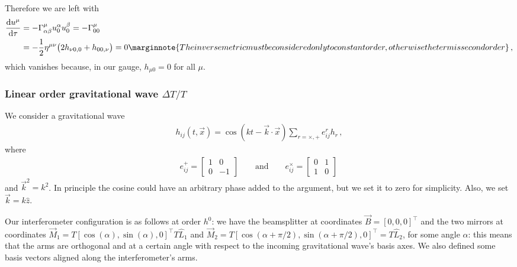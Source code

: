 \documentclass[main.tex]{subfiles}
\begin{document}
Therefore we are left with 
%
\begin{subequations}
\begin{align}
\dv{ u^{\mu }}{\tau } &= - \Gamma^{\mu }_{\alpha \beta } u^{\alpha }_{0} u^{\beta }_{0} = - \Gamma^{\mu }_{00} \\
&= - \frac{1}{2} \eta^{\mu \nu } \qty(2h_{\nu  0, 0} + h_{00,\nu }) = 0 \marginnote{The inverse metric must be considered only to constant order, otherwise the term is second order}
\,,
\end{align}
\end{subequations}
%
which vanishes because, in our gauge, \(h_{\mu 0} = 0\) for all \(\mu \). 

\subsubsection{Linear order gravitational wave \(\Delta T / T\)}

We consider a gravitational wave 
%
\begin{align}
h_{ij} (t, \vec{x}) = \cos(kt - \vec{k} \cdot \vec{x}) \sum _{r = \times , +} e_{ij}^{r} h_{r}
\,,
\end{align}
%
where 
%
\begin{subequations}
\begin{align}
e_{ij}^{+} = \left[\begin{array}{cc}
1 &  0 \\ 
0 & -1
\end{array}\right] \qquad \text{and} \qquad
e_{ij}^{ \times } = \left[\begin{array}{cc}
0 & 1 \\ 
1 & 0
\end{array}\right]
\,
\end{align}
\end{subequations}
%
and \(\vec{k}^2 = k^2\). In principle the cosine could have an arbitrary phase added to the argument, but we set it to zero for simplicity. 
Also, we set \(\vec{k} = k \hat{z}\). 

Our interferometer configuration is as follows at order \(h^{0}\): we have the beamsplitter at coordinates \(\vec{B} = [0,0,0]^{\top}\) and the two mirrors at coordinates \(\vec{M}_{1} = T [\cos(\alpha ), \sin(\alpha ),0]^{\top} T \hat{L}_{1}\) and \(\vec{M}_{2} = T [ \cos(\alpha + \pi /2), \sin(\alpha + \pi /2),0]^{\top} = T \hat{L}_{2}\), for some angle \(\alpha \): this means that the arms are orthogonal and at a certain angle with respect to the incoming gravitational wave's basis axes. 
We also defined some basis vectors aligned along the interferometer's arms. 
\end{document}
